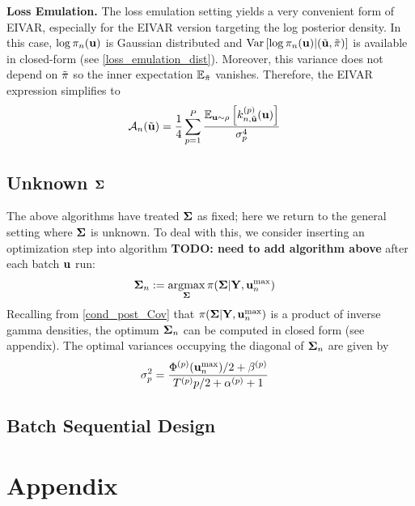 \documentclass[12pt]{article}
\begin{document}
\bigskip
\noindent
\textbf{Loss Emulation.} The loss emulation setting yields a very convenient form of EIVAR, especially for the EIVAR version targeting the log posterior density. In this case,
$\log \postDens_{\designIdx}(\bpar)$ is Gaussian distributed and $\Var\left[\log \postDens_{\designIdx}(\bpar) | (\tilde{\bpar}, \tilde{\postDens}) \right]$ is 
available in closed-form (see \ref{loss_emulation_dist}). Moreover, this variance does not depend on $\tilde{\postDens}$ so the inner expectation $\E_{\tilde{\postDens}}$ vanishes. 
Therefore, the EIVAR expression simplifies to
\begin{align}
\acq[\designIdx](\tilde{\bpar}) &= \frac{1}{4} \sum_{\objIdx = 1}^{\Nobj} \frac{\E_{\bpar \sim \rho}\left[\GPKerPredOut{\designIdx, \tilde{\bpar}}{\objIdx}(\bpar)\right]}{\sdObs_{\objIdx}^4} \label{EIVAR_llik_loss_emulation}
\end{align}

\subsection{Unknown $\CovObs$}
The above algorithms have treated $\CovObs$ as fixed; here we return to the general setting where $\CovObs$ is unknown. To deal with this, we consider inserting an 
optimization step into algorithm \textbf{TODO: need to add algorithm above} after each batch $\bpar$ run:
\begin{align}
\CovObs_{\designIdx} &:= \argmax_{\CovObs} \postDens(\CovObs|\stateMat, \currParMax{\designIdx}) \label{Cov_optimization}
\end{align}
Recalling from \ref{cond_post_Cov} that $\postDens(\CovObs|\stateMat, \currParMax{\designIdx})$ is a product of inverse gamma densities, the optimum $\CovObs_{\designIdx}$ can 
be computed in closed form (see appendix). The optimal variances occupying the diagonal of $\CovObs_{\designIdx}$ are given by 
\begin{align}
\sdObs_{\objIdx}^2 &= \frac{\indexObj{\SSR}(\currParMax{\designIdx})/2 + \indexObj{\IGScale}}{\indexObj{\Ntime}{\objIdx}/2 + \indexObj{\IGShape} + 1}
\end{align}

\subsection{Batch Sequential Design}


\section{Appendix}
\end{document}
